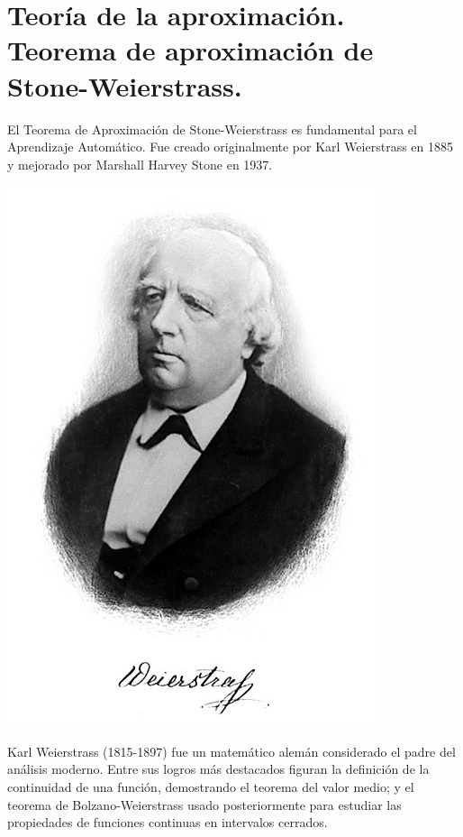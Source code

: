 \documentclass[11pt,twoside,titlepage,a4paper]{article}
\numberwithin{equation}{section} %
\theoremstyle{usual}
\begin{document}
\newpage
\section{Teoría de la aproximación. Teorema de aproximación de Stone-Weierstrass.}
El Teorema de Aproximación de Stone-Weierstrass es fundamental para el Aprendizaje Automático. Fue creado originalmente por Karl Weierstrass en 1885 y mejorado por Marshall Harvey Stone en 1937.

\begin{marginfigure}
    \includegraphics[width=\marginparwidth]{Source/images/weierstrass.jpg}
    \caption{Karl Weierstrass (1815-1897) \cite{weierstrass-wikipedia} fue un matemático alemán considerado el padre del análisis moderno. Entre sus logros más destacados figuran la definición de la continuidad de una función, demostrando el teorema del valor medio; y el teorema de Bolzano-Weierstrass usado posteriormente para estudiar las propiedades de funciones continuas en intervalos cerrados.}
\end{marginfigure}
\end{document}
